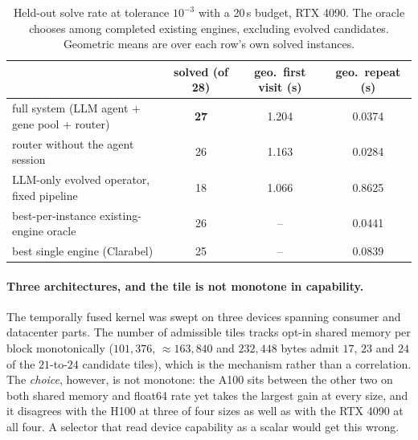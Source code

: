 \begin{table}[H]
\centering
\small
\begin{tabular}{lccc}
\toprule
 & solved (of 28) & geo.\ first visit (s) & geo.\ repeat (s) \\
\midrule
full system (LLM agent + gene pool + router) & \textbf{27} & 1.204 & 0.0374 \\
router without the agent session & 26 & 1.163 & 0.0284 \\
LLM-only evolved operator, fixed pipeline & 18 & 1.066 & 0.8625 \\
\midrule
best-per-instance existing-engine oracle & 26 & -- & 0.0441 \\
best single engine (Clarabel) & 25 & -- & 0.0839 \\
\bottomrule
\end{tabular}
\caption{Held-out solve rate at tolerance $10^{-3}$ with a 20\,s budget, RTX
4090. The oracle chooses among completed existing engines, excluding evolved
candidates. Geometric means are over each row's own solved instances.}
\label{tab:llm}
\end{table}

\paragraph{Three architectures, and the tile is not monotone in capability.}
The temporally fused kernel was swept on three devices spanning consumer and
datacenter parts. The number of admissible tiles tracks opt-in shared memory
per block monotonically ($101{,}376$, ${\approx}163{,}840$ and $232{,}448$
bytes admit $17$, $23$ and $24$ of the $21$-to-$24$ candidate tiles), which is
the mechanism rather than a correlation. The \emph{choice}, however, is not
monotone: the A100 sits between the other two on both shared memory and
float64 rate yet takes the largest gain at every size, and it disagrees with
the H100 at three of four sizes as well as with the RTX 4090 at all four. A
selector that read device capability as a scalar would get this wrong.

